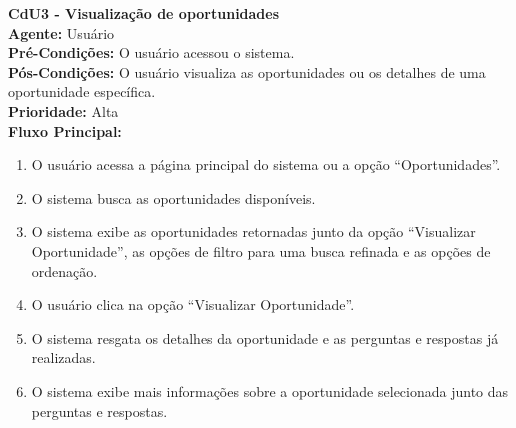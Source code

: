 

\vspace{7pt}
\noindent\textbf{\normalsize CdU3 - Visualização de oportunidades}\\
\textbf{Agente:} Usuário \\ 
\textbf{Pré-Condições:} O usuário acessou o sistema.\\
\textbf{Pós-Condições:} O usuário visualiza as oportunidades ou os detalhes de uma oportunidade específica.\\
\textbf{Prioridade:} Alta \vspace{3pt}\\
\noindent\textbf{Fluxo Principal:}
\begin{enumerate}[noitemsep, topsep=-5pt, parsep=0pt]
    \item O usuário acessa a página principal do sistema ou a opção “Oportunidades”.
    \item O sistema busca as oportunidades disponíveis.
    \item O sistema exibe as oportunidades retornadas junto da opção “Visualizar Oportunidade”, as opções de filtro para uma busca refinada e as opções de ordenação.
    \item O usuário clica na opção “Visualizar Oportunidade”.
    \item O sistema resgata os detalhes da oportunidade e as perguntas e respostas já realizadas.
    \item O sistema exibe mais informações sobre a oportunidade selecionada junto das perguntas e respostas.
\end{enumerate}


